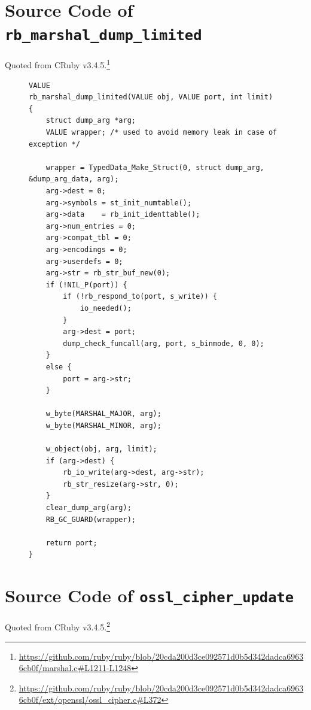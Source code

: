 \appendix
\section{Source Code of \texttt{rb\_marshal\_dump\_limited}}\label{app:rb_marshal_dump_limited}
Quoted from CRuby v3.4.5.\footnote{\url{https://github.com/ruby/ruby/blob/20cda200d3ce092571d0b5d342dadca69636cb0f/marshal.c#L1211-L1248}}

\begin{figure}[tb]
\begin{lstlisting}[caption={Source code of \texttt{rb\_marshal\_dump\_limited}},label={lst:rb_marshal_dump_limited_full}]
VALUE
rb_marshal_dump_limited(VALUE obj, VALUE port, int limit)
{
    struct dump_arg *arg;
    VALUE wrapper; /* used to avoid memory leak in case of exception */

    wrapper = TypedData_Make_Struct(0, struct dump_arg, &dump_arg_data, arg);
    arg->dest = 0;
    arg->symbols = st_init_numtable();
    arg->data    = rb_init_identtable();
    arg->num_entries = 0;
    arg->compat_tbl = 0;
    arg->encodings = 0;
    arg->userdefs = 0;
    arg->str = rb_str_buf_new(0);
    if (!NIL_P(port)) {
        if (!rb_respond_to(port, s_write)) {
            io_needed();
        }
        arg->dest = port;
        dump_check_funcall(arg, port, s_binmode, 0, 0);
    }
    else {
        port = arg->str;
    }

    w_byte(MARSHAL_MAJOR, arg);
    w_byte(MARSHAL_MINOR, arg);

    w_object(obj, arg, limit);
    if (arg->dest) {
        rb_io_write(arg->dest, arg->str);
        rb_str_resize(arg->str, 0);
    }
    clear_dump_arg(arg);
    RB_GC_GUARD(wrapper);

    return port;
}
\end{lstlisting}
\end{figure}

\section{Source Code of \texttt{ossl\_cipher\_update}}\label{app:ossl_cipher_update}
Quoted from CRuby v3.4.5.\footnote{\url{https://github.com/ruby/ruby/blob/20cda200d3ce092571d0b5d342dadca69636cb0f/ext/openssl/ossl_cipher.c#L372}}

